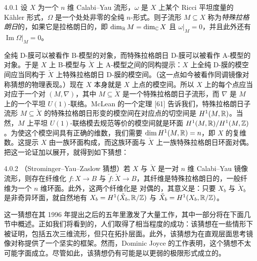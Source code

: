 \begin{definition}{4.0.1}
设 $X$ 为一个 $n$ 维 Calabi--Yau 流形，$\omega$ 是 $X$ 上某个 Ricci 平坦度量的 Kähler 形式，$\Omega$ 是一个处处非零的全纯 $n$-形式。则子流形 $M\subseteq X$ 称为\emph{特殊拉格朗日}的，如果它是拉格朗日的，即 $\dim_{\mathbb{R}}M=\dim_{\mathbb{C}}X$ 且 $\omega|_M=0$，并且此外还有 $\operatorname{Im}\Omega|_M=0$。
\end{definition}

全纯 D-膜可以被看作 B-模型的对象，而特殊拉格朗日 D-膜可以被看作 A-模型的对象。于是 $X$ 上 B-模型与 $\check X$ 上 A-模型之间的同构提示：$X$ 上全纯 D-膜的模空间应当同构于 $\check X$ 上特殊拉格朗日 D-膜的模空间。（这一点如今被看作同调镜像对称猜想的物理表现。）现在 $X$ 本身就是 $X$ 上点的模空间。所以 $X$ 上的每个点应当对应于一个对 $(M,\nabla)$，其中 $M\subseteq\check X$ 是一个特殊拉格朗日子流形，而 $\nabla$ 是 $M$ 上的一个平坦 $U(1)$-联络。McLean 的一个定理 [61] 告诉我们，特殊拉格朗日子流形 $M\subseteq\check X$ 的特殊拉格朗日形变的模空间在对应点的切空间是 $H^1(M,\mathbb{R})$。当然，$M$ 上平坦 $U(1)$-联络模去规范等价的模空间就是环面 $H^1(M,\mathbb{R})/H^1(M,\mathbb{Z})$。为使这个模空间具有正确的维数，我们需要 $\dim H^1(M,\mathbb{R})=n$，即 $X$ 的复维数。这提示 $X$ 由一族环面构成，而这族环面与 $\check X$ 上一族特殊拉格朗日环面对偶。把这一论证加以展开，就得到如下猜想：

\begin{conjecture}{4.0.2}
（Strominger--Yau--Zaslow 猜想）若 $X$ 与 $\check X$ 是一对 $n$ 维 Calabi--Yau 镜像流形，则存在纤维化 $f:X\to B$ 与 $\check f:\check X\to B$，其纤维是特殊拉格朗日的，一般纤维为一个 $n$ 维环面。此外，这两个纤维化是
对偶的，其意义是：只要 $X_b$ 与 $\check X_b$ 是非奇异环面，就自然地有 $X_b=H^1(\check X_b,\mathbb{R}/\mathbb{Z})$ 与 $\check X_b=H^1(X_b,\mathbb{R}/\mathbb{Z})$。
\end{conjecture}

这一猜想在其 1996 年提出之后的五年里激发了大量工作，其中一部分将在下面几节中概述。正如我们将看到的，人们取得了相当程度的成功：该猜想在一些情形下被证明，包括五次三维流形，但只在拓扑层面。此外，该猜想为在直观层面思考镜像对称提供了一个坚实的框架。然而，Dominic Joyce 的工作表明，这个猜想不太可能字面成立。尽管如此，该猜想仍有可能是以更弱的极限形式成立的。

